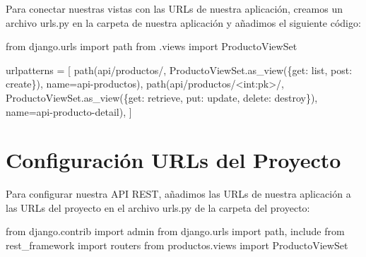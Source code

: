 \documentclass[
  a4paper,
  DIV=11,
  numbers=noendperiod,
  onepage,
  openany]{scrreprt}
\newenvironment{Shaded}{\begin{snugshade}}{\end{snugshade}}
\newcommand{\ImportTok}[1]{\textcolor[rgb]{0.00,0.46,0.62}{#1}}
\newcommand{\NormalTok}[1]{\textcolor[rgb]{0.00,0.23,0.31}{#1}}
\newcommand{\OperatorTok}[1]{\textcolor[rgb]{0.37,0.37,0.37}{#1}}
\newcommand{\StringTok}[1]{\textcolor[rgb]{0.13,0.47,0.30}{#1}}
\begin{document}
\begin{tcolorbox}
Para conectar nuestras vistas con las URLs de nuestra aplicación,
creamos un archivo urls.py en la carpeta de nuestra aplicación y
añadimos el siguiente código:

\begin{Shaded}
\begin{Highlighting}[]
\ImportTok{from}\NormalTok{ django.urls }\ImportTok{import}\NormalTok{ path}
\ImportTok{from}\NormalTok{ .views }\ImportTok{import}\NormalTok{ ProductoViewSet}

\NormalTok{urlpatterns }\OperatorTok{=}\NormalTok{ [}
\NormalTok{    path(}\StringTok{\textquotesingle{}api/productos/\textquotesingle{}}\NormalTok{, ProductoViewSet.as\_view(\{}\StringTok{\textquotesingle{}get\textquotesingle{}}\NormalTok{: }\StringTok{\textquotesingle{}list\textquotesingle{}}\NormalTok{, }\StringTok{\textquotesingle{}post\textquotesingle{}}\NormalTok{: }\StringTok{\textquotesingle{}create\textquotesingle{}}\NormalTok{\}), name}\OperatorTok{=}\StringTok{\textquotesingle{}api{-}productos\textquotesingle{}}\NormalTok{),}
\NormalTok{    path(}\StringTok{\textquotesingle{}api/productos/\textless{}int:pk\textgreater{}/\textquotesingle{}}\NormalTok{, ProductoViewSet.as\_view(\{}\StringTok{\textquotesingle{}get\textquotesingle{}}\NormalTok{: }\StringTok{\textquotesingle{}retrieve\textquotesingle{}}\NormalTok{, }\StringTok{\textquotesingle{}put\textquotesingle{}}\NormalTok{: }\StringTok{\textquotesingle{}update\textquotesingle{}}\NormalTok{, }\StringTok{\textquotesingle{}delete\textquotesingle{}}\NormalTok{: }\StringTok{\textquotesingle{}destroy\textquotesingle{}}\NormalTok{\}), name}\OperatorTok{=}\StringTok{\textquotesingle{}api{-}producto{-}detail\textquotesingle{}}\NormalTok{),}
\NormalTok{]}
\end{Highlighting}
\end{Shaded}

\section{Configuración URLs del
Proyecto}\label{configuraciuxf3n-urls-del-proyecto}

Para configurar nuestra API REST, añadimos las URLs de nuestra
aplicación a las URLs del proyecto en el archivo urls.py de la carpeta
del proyecto:

\begin{Shaded}
\begin{Highlighting}[]
\ImportTok{from}\NormalTok{ django.contrib }\ImportTok{import}\NormalTok{ admin}
\ImportTok{from}\NormalTok{ django.urls }\ImportTok{import}\NormalTok{ path, include}
\ImportTok{from}\NormalTok{ rest\_framework }\ImportTok{import}\NormalTok{ routers}
\ImportTok{from}\NormalTok{ productos.views }\ImportTok{import}\NormalTok{ ProductoViewSet}


\end{Highlighting}
\end{Shaded}
\end{tcolorbox}
\end{document}
